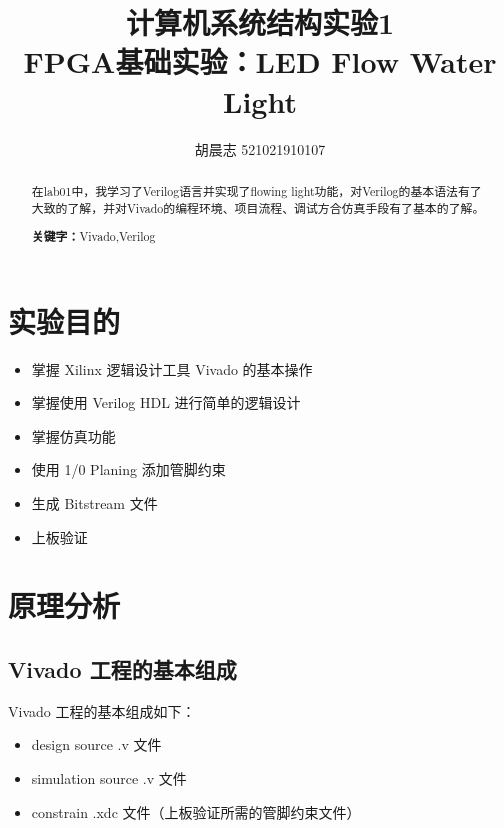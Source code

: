 \documentclass{progartcn}
\title{\bfseries\sffamily
  计算机系统结构实验1 \\ FPGA基础实验：LED Flow Water Light
}
\author{胡晨志 521021910107}
\date{}
\begin{document}
\sloppy %


\maketitle
\thispagestyle{empty}

\begin{abstract}
\noindent 在lab01中，我学习了Verilog语言并实现了flowing light功能，对Verilog的基本语法有了大致的了解，并对Vivado的编程环境、项目流程、调试方合仿真手段有了基本的了解。

\vspace{2ex}
\noindent \textbf{关键字：}Vivado,\hspace{.5em}Verilog
\end{abstract}

\tableofcontents

\setcounter{page}{0}
\newpage

\section{实验目的}

\begin{itemize}
  \item 掌握 Xilinx 逻辑设计工具 Vivado 的基本操作
  \item 掌握使用 Verilog HDL 进行简单的逻辑设计
  \item 掌握仿真功能
  \item 使用 1/0 Planing 添加管脚约束
  \item 生成 Bitstream 文件
  \item 上板验证
\end{itemize}

\section{原理分析}

\subsection{Vivado 工程的基本组成}

Vivado 工程的基本组成如下：

\begin{itemize}
  \item design source .v 文件
  \item simulation source .v 文件
  \item constrain .xdc 文件（上板验证所需的管脚约束文件）
\end{itemize}
\end{document}
